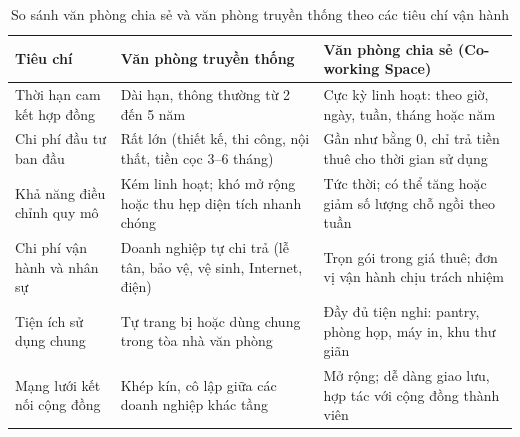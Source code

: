 \begin{table}[H]
\centering
\caption{So sánh văn phòng chia sẻ và văn phòng truyền thống theo các tiêu chí vận hành}
\label{tab:sosanh_vanphong}
\small
\renewcommand{\arraystretch}{1.25}
\begin{tabular}{|p{3.4cm}|p{5.4cm}|p{5.4cm}|}
\hline
\textbf{Tiêu chí} & \textbf{Văn phòng truyền thống} & \textbf{Văn phòng chia sẻ (Co-working Space)} \\
\hline
Thời hạn cam kết hợp đồng & Dài hạn, thông thường từ 2 đến 5 năm & Cực kỳ linh hoạt: theo giờ, ngày, tuần, tháng hoặc năm \\
\hline
Chi phí đầu tư ban đầu & Rất lớn (thiết kế, thi công, nội thất, tiền cọc 3--6 tháng) & Gần như bằng 0, chỉ trả tiền thuê cho thời gian sử dụng \\
\hline
Khả năng điều chỉnh quy mô & Kém linh hoạt; khó mở rộng hoặc thu hẹp diện tích nhanh chóng & Tức thời; có thể tăng hoặc giảm số lượng chỗ ngồi theo tuần \\
\hline
Chi phí vận hành và nhân sự & Doanh nghiệp tự chi trả (lễ tân, bảo vệ, vệ sinh, Internet, điện) & Trọn gói trong giá thuê; đơn vị vận hành chịu trách nhiệm \\
\hline
Tiện ích sử dụng chung & Tự trang bị hoặc dùng chung trong tòa nhà văn phòng & Đầy đủ tiện nghi: pantry, phòng họp, máy in, khu thư giãn \\
\hline
Mạng lưới kết nối cộng đồng & Khép kín, cô lập giữa các doanh nghiệp khác tầng & Mở rộng; dễ dàng giao lưu, hợp tác với cộng đồng thành viên \\
\hline
\end{tabular}
\end{table}

